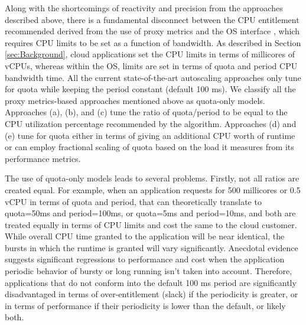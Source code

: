 Along with the shortcomings of reactivity and precision from the approaches described above, there is a fundamental disconnect between the CPU entitlement recommended derived from the use of proxy metrics and the OS interface , which requires CPU limits to be set as a function of bandwidth. As described in Section \ref{sec:Background}, cloud applications set the CPU limits in terms of millicores of vCPUs, whereas within the OS, limits are set in terms of quota and period CPU bandwidth time. All the current state-of-the-art autoscaling approaches only tune for quota while keeping the period constant (default 100 ms). We classify all the proxy metrics-based approaches mentioned above as quota-only models. Approaches (a), (b), and (c) tune the ratio of quota/period to be equal to the CPU utilization percentage recommended by the algorithm. Approaches (d) and (e) tune for quota either in terms of giving an additional CPU worth of runtime or can employ fractional scaling of quota based on the load it measures from its performance metrics.

The use of quota-only models leads to several problems. Firstly, not all ratios are created equal. For example, when an application requests for 500 millicores or 0.5 vCPU in terms of quota and period, that can theoretically translate to quota=50ms and period=100ms, or quota=5ms and period=10ms, and both are treated equally in terms of CPU limits and cost the same to the cloud customer. While overall CPU time granted to the application will be near identical, the bursts in which the runtime is granted will vary significantly. Anecdotal evidence \cite{noauthor_avoid_nodate,noauthor_runtime_nodate} suggests significant regressions to performance and cost when the application periodic behavior of bursty or long running isn't taken into account. Therefore, applications that do not conform into the default 100 ms period are significantly disadvantaged in terms of over-entitlement (slack) if the periodicity is greater, or in terms of performance if their periodicity is lower than the default, or likely both.

